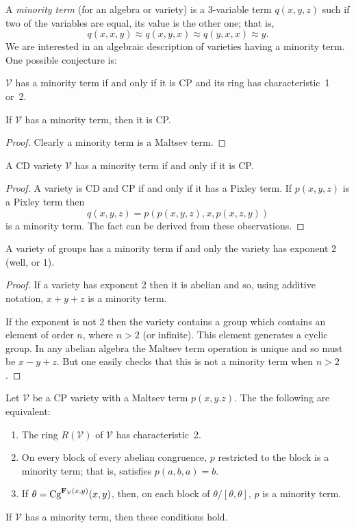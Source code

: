 A \emph{minority term} (for an algebra or variety) is a 
3-variable term $q(x,y,z)$ such if two of the variables
are equal, its value is the other one; that is, 
\[
q(x,x,y) \approx q(x,y,x) \approx q(y,x,x) \approx y.
\]
We are interested in an algebraic description of varieties having
a minority term. One possible conjecture is:
\begin{conjecture}
$\mathcal V$ has a minority term if and only if it is CP and its
ring has characteristic~1 or~2.
\end{conjecture}



\begin{fact}
If $\mathcal V$ has a minority term, then it is CP.
\end{fact}

\begin{proof}
Clearly a minority term is a Maltsev term.
\end{proof}

\begin{fact}
A CD variety $\mathcal V$ has a minority term if and
only if it is CP.
\end{fact}

\begin{proof}
A variety is CD and CP if and only if it has a Pixley term. 
If $p(x,y,z)$ is a Pixley term then 
\[
q(x,y,z) = p(p(x,y,z),x,p(x,z,y))
\]
is a minority term. The fact can be derived from these
observations.
\end{proof}

\begin{fact}
A variety of groups has a minority term if and only
the variety has exponent 2 (well, or 1).
\end{fact}

\begin{proof}
If a variety has exponent 2 then it is abelian and so,
using additive notation, $x + y + z$ is a minority term.

If the exponent is not 2 then the variety contains a group
which contains an element of order $n$, where $n > 2$ (or 
infinite). This element generates a cyclic group. In any
abelian algebra the Maltsev term operation is unique and so
must be $x - y + z$. But one easily checks that this is not
a minority term when $n > 2$.
\end{proof}

\begin{lemma}
Let $\mathcal V$ be a CP variety with a Maltsev term $p(x,y.z)$.
The the following are equivalent:
\begin{enumerate}
\item
The ring $R(\mathcal V)$ of $\mathcal V$ has characteristic~2.
\item
On every block of every abelian congruence, $p$ restricted to the 
block is a minority term; that is, satisfies $p(a,b,a) = b$.
\item
If $\theta = \textup{Cg}^{\mathbf{F}_{\mathcal V}(x,y)}(x,y)$, then,
on each block of $\theta/[\theta,\theta]$, $p$ is a minority term.
\end{enumerate}
If $\mathcal V$ has a minority term, then these conditions hold.
\end{lemma}

